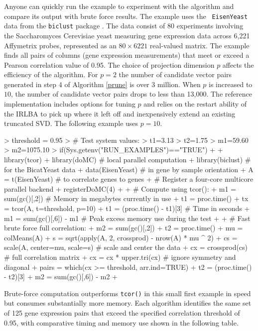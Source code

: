 \documentclass[article]{jss}
\numberwithin{algorithmctr}{section}
\begin{document}
Anyone can quickly run the example to experiment with the algorithm and
compare its output with brute force results. The example uses the {\tt
EisenYeast} data from the {\tt biclust}  package \citep{biclust}.
The data consist of 80 experiments involving the
Saccharomyces Cerevisiae yeast measuring gene expression data across 6,221
Affymetrix probes, represented as an $80\times 6221$ real-valued matrix.  The
example finds all pairs of columns (gene expression measurements) that meet or exceed a
Pearson correlation value of 0.95. The choice of projection dimension $p$ affects
the efficiency of the algorithm. For $p=2$ the number of candidate vector pairs
generated in step 4 of Algorithm \ref{prune} is over 3 million. When $p$ is increased
to $10$, the number of candidate vector pairs drops to less than 13,000.
The reference  implementation includes options for
tuning $p$ and relies on the restart ability of the IRLBA to pick up where it left off and
inexpensively extend an existing truncated SVD. The following example uses $p=10$.
\begin{small}
\begin{Schunk}
\begin{Sinput}
> threshold = 0.95
> # Test system values:
> t1=3.13
> t2=1.75
> m1=59.60
> m2=1075.10
> if(Sys.getenv("RUN_EXAMPLES")=="TRUE")
+ {
+ library(tcor)
+ library(doMC)     # local parallel computation
+ library(biclust)  # for the BicatYeast data
+ data(EisenYeast)  # in gene by sample orientation
+ A = t(EisenYeast) # to correlate genes to genes
+ # Register a four-core multicore parallel backend
+ registerDoMC(4)
+ 
+ # Compute using tcor():
+ m1  = sum(gc()[,2])  # Memory in megabytes currently in use
+ t1  = proc.time()
+ tx  = tcor(A, t=threshold, p=10)
+ t1  = (proc.time() - t1)[3] # Time in seconds
+ m1  = sum(gc()[,6]) - m1    # Peak excess memory use during the test
+ 
+ # Fast brute force full correlation:
+ m2  = sum(gc()[,2])
+ t2  = proc.time()
+ mu = colMeans(A)
+ s  = sqrt(apply(A, 2, crossprod) - nrow(A) * mu ^ 2)
+ cs = scale(A, center=mu, scale=s)  # scale and center the data
+ cx = crossprod(cs)                 # full correlation matrix
+ cx  = cx * upper.tri(cx)    # ignore symmetry and diagonal
+ pairs = which(cx >= threshold, arr.ind=TRUE)
+ t2  = (proc.time() - t2)[3]
+ m2  = sum(gc()[,6]) - m2
+ }
\end{Sinput}
\end{Schunk}
\end{small}
Brute-force computation outperforms {\tt tcor()} in this small first example in
speed but consumes substantially more memory.  Each algorithm identifies the
same set of 125 gene expression pairs that exceed the specified correlation
threshold of 0.95, with comparative timing and memory use shown in the
following table.
\end{document}
